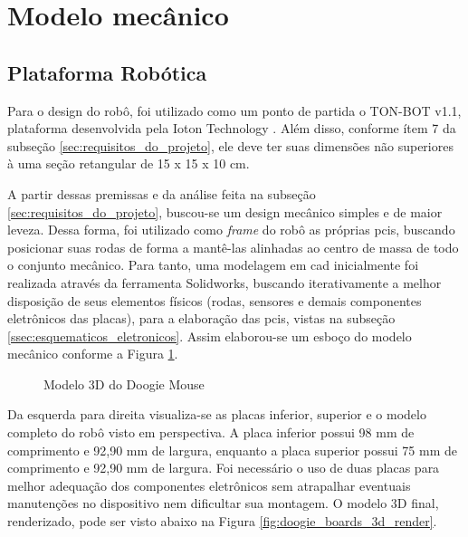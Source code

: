 \section{Modelo mecânico}
\label{sec:modelo_mecanico}

\subsection{Plataforma Robótica}
\label{ssec:plataforma_robotica}

Para o design do robô, foi utilizado como um ponto de partida o TON-BOT v1.1, plataforma desenvolvida pela Ioton Technology \cite{ioton}. Além disso, conforme ítem 7 da subseção \ref{sec:requisitos_do_projeto}, ele deve ter suas dimensões não superiores à uma seção retangular de 15 x 15 x 10 cm.

A partir dessas premissas e da análise feita na subseção \ref{sec:requisitos_do_projeto}, buscou-se um design mecânico simples e de maior leveza. Dessa forma, foi utilizado como \textit{frame} do robô as próprias \glspl*{pci}, buscando posicionar suas rodas de forma a mantê-las alinhadas ao centro de massa de todo o conjunto mecânico. Para tanto, uma modelagem em \gls*{cad} inicialmente foi realizada através da ferramenta Solidworks, buscando iterativamente a melhor disposição de seus elementos físicos (rodas, sensores e demais componentes eletrônicos das placas), para a elaboração das \glspl*{pci}, vistas na subseção \ref{ssec:esquematicos_eletronicos}. Assim elaborou-se um esboço do modelo mecânico conforme a Figura \ref{fig:doogie_boards_3d}.

\begin{figure}[H]
	\centering
	\caption{Modelo 3D do Doogie Mouse}
	\label{fig:doogie_boards_3d}
\end{figure}

Da esquerda para direita visualiza-se as placas inferior, superior e o modelo completo do robô visto em perspectiva. A placa inferior possui 98 mm de comprimento e 92,90 mm de largura, enquanto a placa superior possui 75 mm de comprimento e 92,90 mm de largura. Foi necessário o uso de duas placas para melhor adequação dos componentes eletrônicos sem atrapalhar eventuais manutenções no dispositivo nem dificultar sua montagem. O modelo 3D final, renderizado, pode ser visto abaixo na Figura \ref{fig:doogie_boards_3d_render}.

